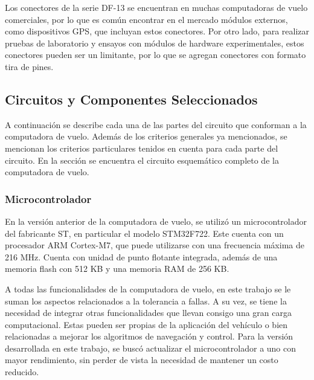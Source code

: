 Los conectores de la serie DF-13 se encuentran en muchas computadoras de vuelo comerciales, por lo que es común encontrar en el mercado módulos externos, como dispositivos GPS, que incluyan estos conectores. Por otro lado, para realizar pruebas de laboratorio y ensayos con módulos de hardware experimentales, estos conectores pueden ser un limitante, por lo que se agregan conectores con formato tira de pines.

\subsection{Circuitos y Componentes Seleccionados}

A continuación se describe cada una de las partes del circuito que conforman a la computadora de vuelo. Además de los criterios generales ya mencionados, se mencionan los criterios particulares tenidos en cuenta para cada parte del circuito. En la sección  se encuentra el circuito esquemático completo de la computadora de vuelo.

\subsubsection{Microcontrolador}



En la versión anterior de la computadora de vuelo, se utilizó un microcontrolador del fabricante ST, en particular el modelo STM32F722. Este cuenta con un procesador ARM Cortex-M7, que puede utilizarse con una frecuencia máxima de 216 MHz. Cuenta con unidad de punto flotante integrada, además de una memoria flash con 512 KB y una memoria RAM de 256 KB.

A todas las funcionalidades de la computadora de vuelo, en este trabajo se le suman los aspectos relacionados a la tolerancia a fallas. A su vez, se tiene la necesidad de integrar otras funcionalidades que llevan consigo una gran carga computacional. Estas pueden ser propias de la aplicación del vehículo o bien relacionadas a mejorar los algoritmos de navegación y control. Para la versión desarrollada en este trabajo, se buscó actualizar el microcontrolador a uno con mayor rendimiento, sin perder de vista la necesidad de mantener un costo reducido.

